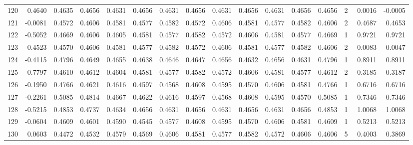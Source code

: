 \begin{tabular}{lrrrrrrrrrrrrrrr}
120 &      0.4640 &  0.4635 &  0.4656 &  0.4631 &  0.4656 &  0.4631 &  0.4656 &  0.4631 &  0.4656 &  0.4631 &   0.4656 &     0.4656 &      2 &                    0.0016 &                    -0.0005 \\
121 &     -0.0081 &  0.4572 &  0.4606 &  0.4581 &  0.4577 &  0.4582 &  0.4572 &  0.4606 &  0.4581 &  0.4577 &   0.4582 &     0.4606 &      2 &                    0.4687 &                     0.4653 \\
122 &     -0.5052 &  0.4669 &  0.4606 &  0.4605 &  0.4581 &  0.4577 &  0.4582 &  0.4572 &  0.4606 &  0.4581 &   0.4577 &     0.4669 &      1 &                    0.9721 &                     0.9721 \\
123 &      0.4523 &  0.4570 &  0.4606 &  0.4581 &  0.4577 &  0.4582 &  0.4572 &  0.4606 &  0.4581 &  0.4577 &   0.4582 &     0.4606 &      2 &                    0.0083 &                     0.0047 \\
124 &     -0.4115 &  0.4796 &  0.4649 &  0.4655 &  0.4638 &  0.4646 &  0.4647 &  0.4656 &  0.4632 &  0.4656 &   0.4631 &     0.4796 &      1 &                    0.8911 &                     0.8911 \\
125 &      0.7797 &  0.4610 &  0.4612 &  0.4604 &  0.4581 &  0.4577 &  0.4582 &  0.4572 &  0.4606 &  0.4581 &   0.4577 &     0.4612 &      2 &                   -0.3185 &                    -0.3187 \\
126 &     -0.1950 &  0.4766 &  0.4621 &  0.4616 &  0.4597 &  0.4568 &  0.4608 &  0.4595 &  0.4570 &  0.4606 &   0.4581 &     0.4766 &      1 &                    0.6716 &                     0.6716 \\
127 &     -0.2261 &  0.5085 &  0.4814 &  0.4667 &  0.4622 &  0.4616 &  0.4597 &  0.4568 &  0.4608 &  0.4595 &   0.4570 &     0.5085 &      1 &                    0.7346 &                     0.7346 \\
128 &     -0.5215 &  0.4853 &  0.4737 &  0.4634 &  0.4656 &  0.4631 &  0.4656 &  0.4631 &  0.4656 &  0.4631 &   0.4656 &     0.4853 &      1 &                    1.0068 &                     1.0068 \\
129 &     -0.0604 &  0.4609 &  0.4601 &  0.4590 &  0.4545 &  0.4577 &  0.4608 &  0.4595 &  0.4570 &  0.4606 &   0.4581 &     0.4609 &      1 &                    0.5213 &                     0.5213 \\
130 &      0.0603 &  0.4472 &  0.4532 &  0.4579 &  0.4569 &  0.4606 &  0.4581 &  0.4577 &  0.4582 &  0.4572 &   0.4606 &     0.4606 &      5 &                    0.4003 &                     0.3869 \\

\end{tabular}
